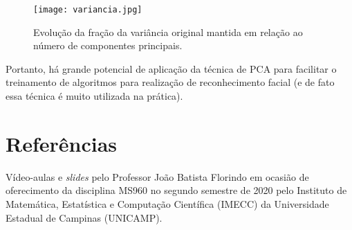 \documentclass[12pt]{article}
\begin{document}
\begin{figure} [htp]
\begin{center}
\texttt{[image: variancia.jpg]}
\caption{Evolução da fração da variância original mantida em relação ao número de componentes principais.} \label{variancia}
\end{center}
\end{figure}

Portanto, há grande potencial de aplicação da técnica de PCA para facilitar o treinamento de algoritmos para realização de reconhecimento facial (e de fato essa técnica é muito utilizada na prática).

\section{Referências}
Vídeo-aulas e \textit{slides} pelo Professor João Batista Florindo em ocasião de oferecimento da disciplina MS960 no segundo semestre de 2020 pelo Instituto de Matemática, Estatística e Computação Científica (IMECC) da Universidade Estadual de Campinas (UNICAMP).
\end{document}
